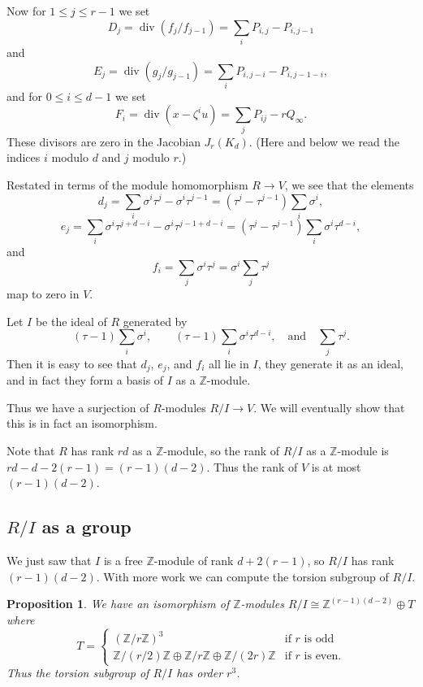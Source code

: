 \documentclass[reqno]{amsart}
\newtheorem{prop}[thm]{Proposition}
\theoremstyle{definition}
\theoremstyle{remark}
\DeclareMathOperator{\dvsr}{div}
\def\Z{\mathbb{Z}}
\begin{document}
Now for $1\le j\le r-1$ we set
$$D_j=\dvsr(f_j/f_{j-1})=\sum_i P_{i,j}-P_{i,j-1}$$
and
$$E_j=\dvsr(g_j/g_{j-1})=\sum_i P_{i,j-i}-P_{i,j-1-i},$$
and for $0\le i\le d-1$ we set
$$F_i=\dvsr(x-\zeta^iu)=\sum_j P_{ij}-rQ_\infty.$$
These divisors are zero in the Jacobian $J_r(K_d)$.  (Here and below
we read the indices $i$ modulo $d$ and $j$ modulo $r$.)

Restated in terms of the module homomorphism $R\to V$, we see that the
elements 
$$d_j=\sum_i \sigma^i\tau^j-\sigma^i\tau^{j-1}
=(\tau^j-\tau^{j-1})\sum_i \sigma^i,$$
$$e_j=\sum_i \sigma^i\tau^{j+d-i}-\sigma^i\tau^{j-1+d-i}=
( \tau^{j}-\tau^{j-1})\sum_i\sigma^i\tau^{d-i},$$
and
$$f_i=\sum_j \sigma^i\tau^j=\sigma^i\sum_j\tau^j$$
map to zero in $V$.

Let $I$ be the ideal of $R$ generated by
$$(\tau-1)\sum_i \sigma^i,\qquad
(\tau-1)\sum_i\sigma^i\tau^{d-i}, \quad\text{and}\quad \sum_j\tau^j.$$
Then it is easy to see that $d_j$, $e_j$, and $f_i$ all lie in $I$,
they generate it as an ideal, and in fact they form a basis of $I$ as
a $\Z$-module.

Thus we have a surjection of $R$-modules $R/I\to V$.  We will
eventually show that this is in fact an isomorphism.

Note that $R$ has rank $rd$ as a $\Z$-module, so the rank of $R/I$ as
a $\Z$-module is $rd-d-2(r-1)=(r-1)(d-2)$.  Thus the rank of $V$ is at
most $(r-1)(d-2)$.  

\subsection{$R/I$ as a group}
We just saw that $I$ is a free $\Z$-module of rank $d+2(r-1)$, so
$R/I$ has rank $(r-1)(d-2)$.  With more work we can compute the torsion
subgroup of $R/I$.

\begin{prop}\label{prop:R/I-as-group}
We have an isomorphism of $\Z$-modules $R/I\cong \Z^{(r-1)(d-2)}\oplus
T$ where
$$T=\begin{cases}
(\Z/r\Z)^3&\text{if $r$ is odd}\\
\Z/(r/2)\Z\oplus\Z/r\Z\oplus\Z/(2r)\Z&\text{if $r$ is even.}
\end{cases}$$
Thus the torsion subgroup of $R/I$ has order $r^3$.
\end{prop}
\end{document}
